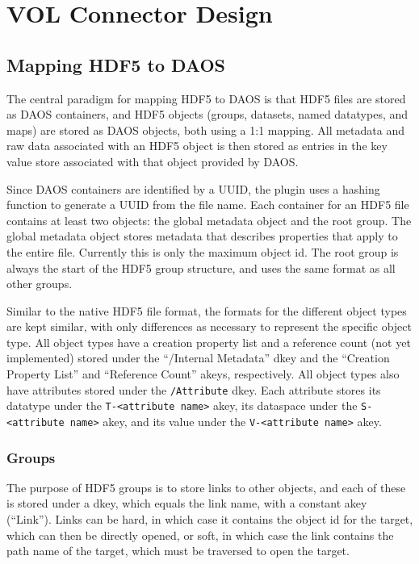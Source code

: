 \section{VOL Connector Design}

\subsection{Mapping HDF5 to DAOS}

The central paradigm for mapping HDF5 to DAOS is that HDF5 files are stored as DAOS containers, and HDF5 objects (groups, datasets, named datatypes, and maps) are stored as DAOS objects, both using a 1:1 mapping. All metadata and raw data associated with an HDF5 object is then stored as entries in the key value store associated with that object provided by DAOS.

Since DAOS containers are identified by a UUID, the plugin uses a hashing function to generate a UUID from the file name. Each container for an HDF5 file contains at least two objects: the global metadata object and the root group. The global metadata object stores metadata that describes properties that apply to the entire file. Currently this is only the maximum object id. The root group is always the start of the HDF5 group structure, and uses the same format as all other groups.

Similar to the native HDF5 file format, the formats for the different object types are kept similar, with only differences as necessary to represent the specific object type. All object types have a creation property list and a reference count (not yet implemented) stored under the ``/Internal Metadata'' dkey and the ``Creation Property List'' and ``Reference Count'' akeys, respectively. All object types also have attributes stored under the \verb+/Attribute+ dkey. Each attribute stores its datatype under the \verb+T-<attribute name>+ akey, its dataspace under the \verb+S-<attribute name>+ akey, and its value under the \verb+V-<attribute name>+ akey.

\subsubsection{Groups}

The purpose of HDF5 groups is to store links to other objects, and each of these is stored under a dkey, which equals the link name, with a constant akey (“Link”). Links can be hard, in which case it contains the object id for the target, which can then be directly opened, or soft, in which case the link contains the path name of the target, which must be traversed to open the target.


